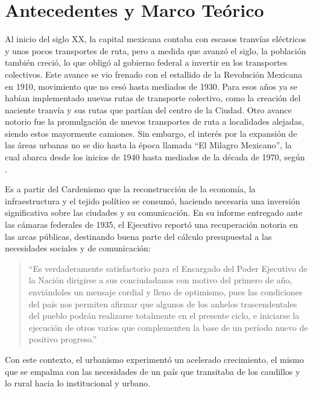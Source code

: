
\chapter{Antecedentes y Marco Teórico}
\label{ch:marco-teorico}

Al inicio del siglo XX, la capital mexicana contaba con escasos tranvías
eléctricos y unos pocos transportes de ruta, pero a medida que avanzó el siglo,
la población también creció, lo que obligó al gobierno federal a invertir en los
transportes colectivos. Este avance se vio frenado con el estallido de la
Revolución Mexicana en 1910, movimiento que no cesó hasta mediados de 1930. Para
esos años ya se habían implementado nuevas rutas de transporte colectivo, como
la creación del naciente tranvía y sus rutas que partían del centro de la
Ciudad. Otro avance notorio fue la promulgación de nuevos transportes de ruta a
localidades alejadas, siendo estos mayormente camiones. Sin embargo, el interés
por la expansión de las áreas urbanas no se dio hasta la época llamada ``El
Milagro Mexicano'', la cual abarca desde los inicios de 1940 hasta mediados de
la década de 1970, según \citet{molina2018}.

Es a partir del Cardenismo que la reconstrucción de la economía, la
infraestructura y el tejido político se consumó, haciendo necesaria una
inversión significativa sobre las ciudades y su comunicación. En su informe
entregado ante las cámaras federales de 1935, el Ejecutivo reportó una
recuperación notoria en las arcas públicas, destinando buena parte del cálculo
presupuestal a las necesidades sociales y de comunicación:

\begin{quote}
``Es verdaderamente satisfactorio para el Encargado del Poder Ejecutivo de la
Nación dirigirse a sus conciudadanos con motivo del primero de año, enviándoles
un mensaje cordial y lleno de optimismo, pues las condiciones del país nos
permiten afirmar que algunos de los anhelos trascendentales del pueblo podrán
realizarse totalmente en el presente ciclo, e iniciarse la ejecución de otros
varios que complementen la base de un período nuevo de positivo progreso.''
\citep[pp.~2--4]{biblioteca1935}
\end{quote}

Con este contexto, el urbanismo experimentó un acelerado crecimiento, el mismo
que se empalma con las necesidades de un país que transitaba de los caudillos y
lo rural hacia lo institucional y urbano.

